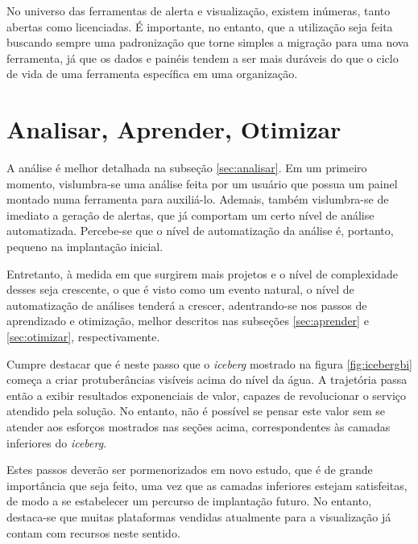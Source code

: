 No universo das ferramentas de alerta e visualização, existem inúmeras, tanto abertas como licenciadas. É importante, no entanto, que a utilização seja feita buscando sempre uma padronização que torne simples a migração para uma nova ferramenta, já que os dados e painéis tendem a ser mais duráveis do que o ciclo de vida de uma ferramenta específica em uma organização.

\section{Analisar, Aprender, Otimizar}
\label{sec-aao}

A análise é melhor detalhada na subseção \ref{sec:analisar}. Em um primeiro momento, vislumbra-se uma análise feita por um usuário que possua um painel montado numa ferramenta para auxiliá-lo. Ademais, também vislumbra-se de imediato a geração de alertas, que já comportam um certo nível de análise automatizada. Percebe-se que o nível de automatização da análise é, portanto, pequeno na implantação inicial.

Entretanto, à medida em que surgirem mais projetos e o nível de complexidade desses seja crescente, o que é visto como um evento natural, o nível de automatização de análises tenderá a crescer, adentrando-se nos passos de aprendizado e otimização, melhor descritos nas subseções \ref{sec:aprender} e \ref{sec:otimizar}, respectivamente.

Cumpre destacar que é neste passo que o \emph{iceberg} mostrado na figura \ref{fig:icebergbi} começa a criar protuberâncias visíveis acima do nível da água. A trajetória passa então a exibir resultados exponenciais de valor, capazes de revolucionar o serviço atendido pela solução. No entanto, não é possível se pensar este valor sem se atender aos esforços mostrados nas seções acima, correspondentes às camadas inferiores do \emph{iceberg}.

Estes passos deverão ser pormenorizados em novo estudo, que é de grande importância que seja feito, uma vez que as camadas inferiores estejam satisfeitas, de modo a se estabelecer um percurso de implantação futuro. No entanto, destaca-se que muitas plataformas vendidas atualmente para a visualização já contam com recursos neste sentido.




